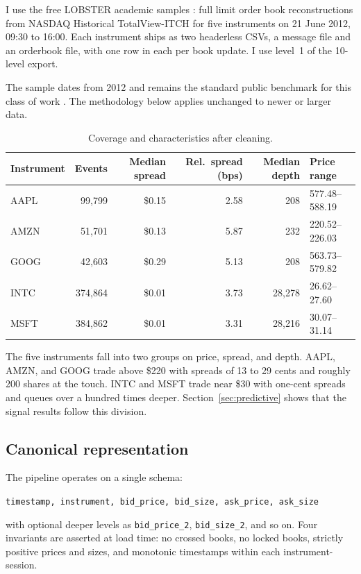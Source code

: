 \documentclass[11pt]{scrartcl}
\begin{document}
I use the free LOBSTER academic samples \cite{Huang2011}: full limit order book reconstructions from NASDAQ Historical TotalView-ITCH for five instruments on 21 June 2012, 09:30 to 16:00. Each instrument ships as two headerless CSVs, a message file and an orderbook file, with one row in each per book update. I use level~1 of the 10-level export.

The sample dates from 2012 and remains the standard public benchmark for this class of work \cite{Kercheval2015}. The methodology below applies unchanged to newer or larger data.

\begin{table}[H]
\centering
\caption{Coverage and characteristics after cleaning.}
\label{tab:coverage}
\begin{tabular}{lrrrrl}
\toprule
Instrument & Events & Median spread & Rel.\ spread (bps) & Median depth & Price range \\
\midrule
AAPL & 99{,}799  & \$0.15 & 2.58 & 208    & 577.48--588.19 \\
AMZN & 51{,}701  & \$0.13 & 5.87 & 232    & 220.52--226.03 \\
GOOG & 42{,}603  & \$0.29 & 5.13 & 208    & 563.73--579.82 \\
INTC & 374{,}864 & \$0.01 & 3.73 & 28{,}278 & 26.62--27.60 \\
MSFT & 384{,}862 & \$0.01 & 3.31 & 28{,}216 & 30.07--31.14 \\
\bottomrule
\end{tabular}
\end{table}

The five instruments fall into two groups on price, spread, and depth. AAPL, AMZN, and GOOG trade above \$220 with spreads of 13 to 29 cents and roughly 200 shares at the touch. INTC and MSFT trade near \$30 with one-cent spreads and queues over a hundred times deeper. Section~\ref{sec:predictive} shows that the signal results follow this division.

\subsection{Canonical representation}
\label{sec:canonical}

The pipeline operates on a single schema:
\begin{center}
\texttt{timestamp, instrument, bid\_price, bid\_size, ask\_price, ask\_size}
\end{center}
with optional deeper levels as \texttt{bid\_price\_2}, \texttt{bid\_size\_2}, and so on. Four invariants are asserted at load time: no crossed books, no locked books, strictly positive prices and sizes, and monotonic timestamps within each instrument-session.
\end{document}

